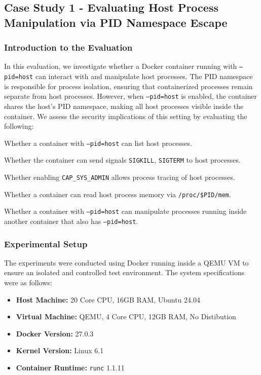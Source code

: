 \subsection{Case Study 1 - Evaluating Host Process Manipulation via PID Namespace Escape}

\subsubsection{Introduction to the Evaluation}

In this evaluation, we investigate whether a Docker container running with \texttt{--pid=host} can interact with and manipulate host processes. The PID namespace is responsible for process isolation, ensuring that containerized processes remain separate from host processes. However, when \texttt{--pid=host} is enabled, the container shares the host's PID namespace, making all host processes visible inside the container. We assess the security implications of this setting by evaluating the following:

\begin{dgenum}
    \item Whether a container with \texttt{--pid=host} can list host processes.
    \item Whether the container can send signals \texttt{SIGKILL}, \texttt{SIG\-TERM} to host processes.
    \item Whether enabling \texttt{CAP\_SYS\_ADMIN} allows process tracing of host processes.
    \item Whether a container can read host process memory via \texttt{/proc/\$PID/mem}.
    \item Whether a container with \texttt{--pid=host} can manipulate processes running inside another container that also has \texttt{--pid=host}.
\end{dgenum}

\subsubsection{Experimental Setup}
The experiments were conducted using Docker running inside a QEMU VM to ensure an isolated and controlled test environment. The system specifications were as follows:

\begin{itemize}
    \item \textbf{Host Machine:} 20 Core CPU, 16GB RAM, Ubuntu 24.04
    \item \textbf{Virtual Machine:} QEMU, 4 Core CPU, 12GB RAM, No Distibution
    \item \textbf{Docker Version:} 27.0.3
    \item \textbf{Kernel Version:} Linux 6.1
    \item \textbf{Container Runtime:} \texttt{runc} 1.1.11
\end{itemize}

